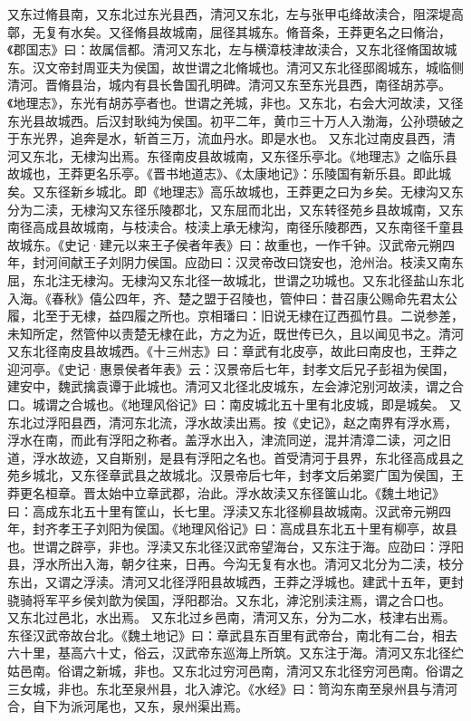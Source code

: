 \documentclass[12pt,UTF8]{ctexbook}
\begin{document}
又东过脩县南，又东北过东光县西，清河又东北，左与张甲屯绛故渎合，阻深堤高鄣，无复有水矣。又径脩县故城南，屈径其城东。脩音条，王莽更名之曰脩治，《郡国志》曰：故属信都。清河又东北，左与横漳枝津故渎合，又东北径脩国故城东。汉文帝封周亚夫为侯国，故世谓之北脩城也。清河又东北径邸阁城东，城临侧清河。晋脩县治，城内有县长鲁国孔明碑。清河又东至东光县西，南径胡苏亭。《地理志》，东光有胡苏亭者也。世谓之羌城，非也。又东北，右会大河故渎，又径东光县故城西。后汉封耿纯为侯国。初平二年，黄巾三十万人入渤海，公孙瓒破之于东光界，追奔是水，斩首三万，流血丹水。即是水也。
又东北过南皮县西，清河又东北，无棣沟出焉。东径南皮县故城南，又东径乐亭北。《地理志》之临乐县故城也，王莽更名乐亭。《晋书地道志》、《太康地记》：乐陵国有新乐县。即此城矣。又东径新乡城北。即《地理志》高乐故城也，王莽更之曰为乡矣。无棣沟又东分为二渎，无棣沟又东径乐陵郡北，又东屈而北出，又东转径苑乡县故城南，又东南径高成县故城南，与枝渎合。枝渎上承无棣沟，南径乐陵郡西，又东南径千童县故城东。《史记·建元以来王子侯者年表》曰：故重也，一作千钟。汉武帝元朔四年，封河间献王子刘阴力侯国。应劭曰：汉灵帝改曰饶安也，沧州治。枝渎又南东屈，东北注无棣沟。无棣沟又东北径一故城北，世谓之功城也。又东北径盐山东北入海。《春秋》僖公四年，齐、楚之盟于召陵也，管仲曰：昔召康公赐命先君太公履，北至于无棣，益四履之所也。京相璠曰：旧说无棣在辽西孤竹县。二说参差，未知所定，然管仲以责楚无棣在此，方之为近，既世传已久，且以闻见书之。清河又东北径南皮县故城西。《十三州志》曰：章武有北皮亭，故此曰南皮也，王莽之迎河亭。《史记·惠景侯者年表》云：汉景帝后七年，封孝文后兄子彭祖为侯国，建安中，魏武擒袁谭于此城也。清河又北径北皮城东，左会滹沱别河故渎，谓之合口。城谓之合城也。《地理风俗记》曰：南皮城北五十里有北皮城，即是城矣。
又东北过浮阳县西，清河东北流，浮水故渎出焉。按《史记》，赵之南界有浮水焉，浮水在南，而此有浮阳之称者。盖浮水出入，津流同逆，混并清漳二读，河之旧道，浮水故迹，又自斯别，是县有浮阳之名也。首受清河于县界，东北径高成县之苑乡城北，又东径章武县之故城北。汉景帝后七年，封孝文后弟窦广国为侯国，王莽更名桓章。晋太始中立章武郡，治此。浮水故渎又东径箧山北。《魏土地记》曰：高成东北五十里有筐山，长七里。浮渎又东北径柳县故城南。汉武帝元朔四年，封齐孝王子刘阳为侯国。《地理风俗记》曰：高成县东北五十里有柳亭，故县也。世谓之辟亭，非也。浮渎又东北径汉武帝望海台，又东注于海。应劭曰：浮阳县，浮水所出入海，朝夕往来，日再。今沟无复有水也。清河又北分为二渎，枝分东出，又谓之浮渎。清河又北径浮阳县故城西，王莽之浮城也。建武十五年，更封骁骑将军平乡侯刘歆为侯国，浮阳郡治。又东北，滹沱别渎注焉，谓之合口也。
又东北过邑北，水出焉。
又东北过乡邑南，清河又东，分为二水，枝津右出焉。东径汉武帝故台北。《魏土地记》曰：章武县东百里有武帝台，南北有二台，相去六十里，基高六十丈，俗云，汉武帝东巡海上所筑。又东注于海。清河又东北径纻姑邑南。俗谓之新城，非也。又东北过穷河邑南，清河又东北径穷河邑南。俗谓之三女城，非也。东北至泉州县，北入滹沱。《水经》曰：笥沟东南至泉州县与清河合，自下为派河尾也，又东，泉州渠出焉。
\end{document}
